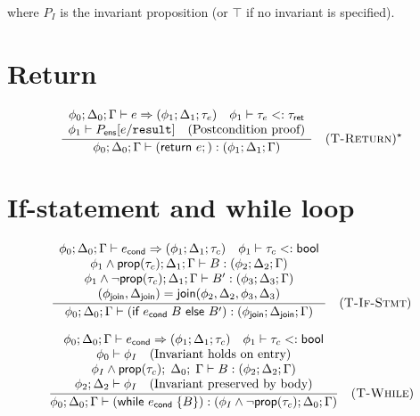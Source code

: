 \noindent where $P_I$ is the invariant proposition (or $\top$ if no invariant is specified).

\section*{Return}

$$
  \frac{
    \begin{array}{c}
      \phi_0; \Delta_0; \Gamma \vdash e \Rightarrow (\phi_1; \Delta_1; \tau_e) \quad \phi_1 \vdash \tau_e <: \tau_\textsf{ret} \\
      \phi_1 \vdash P_\textsf{ens}[e/\mathtt{result}] \quad \text{(Postcondition proof)}
    \end{array}
  }{
    \phi_0; \Delta_0; \Gamma \vdash (\textsf{return } e;) : (\phi_1; \Delta_1; \Gamma)
  } \quad (\textsc{T-Return})^\star
$$

\section*{If-statement and while loop}

$$
  \frac{
    \begin{array}{c}
      \phi_0; \Delta_0; \Gamma \vdash e_\textsf{cond} \Rightarrow (\phi_1; \Delta_1; \tau_c) \quad \phi_1 \vdash \tau_c <: \textsf{bool} \\
      \phi_1 \wedge \textsf{prop}(\tau_c); \Delta_1; \Gamma \vdash B : (\phi_2; \Delta_2; \Gamma)                                        \\
      \phi_1 \wedge \neg \textsf{prop}(\tau_c); \Delta_1; \Gamma \vdash B' : (\phi_3; \Delta_3; \Gamma)                                  \\
      (\phi_\textsf{join}, \Delta_\textsf{join}) = \textsf{join}(\phi_2, \Delta_2, \phi_3, \Delta_3)
    \end{array}
  }{
    \phi_0; \Delta_0; \Gamma \vdash (\textsf{if } e_\textsf{cond}\; B \textsf{ else } B') : (\phi_\textsf{join}; \Delta_\textsf{join}; \Gamma)
  } \quad (\textsc{T-If-Stmt})
$$

$$
  \frac{
    \begin{array}{c}
      \phi_0; \Delta_0; \Gamma \vdash e_\textsf{cond} \Rightarrow (\phi_1; \Delta_1; \tau_c) \quad \phi_1 \vdash \tau_c <: \textsf{bool} \\
      \phi_0 \vdash \phi_I \quad \text{(Invariant holds on entry)}                                                                       \\
      \phi_I \wedge \textsf{prop}(\tau_c);\; \Delta_0;\; \Gamma \vdash B : (\phi_2; \Delta_2; \Gamma)                                    \\
      \phi_2; \Delta_2 \vdash \phi_I \quad \text{(Invariant preserved by body)}
    \end{array}
  }{
    \phi_0; \Delta_0; \Gamma \vdash (\textsf{while } e_\textsf{cond}\;\{B\}) : (\phi_I \wedge \neg\textsf{prop}(\tau_c); \Delta_0; \Gamma)
  } \quad (\textsc{T-While})
$$

